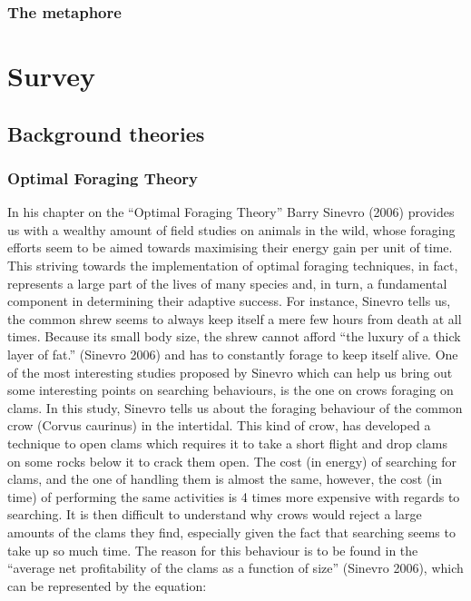 \documentclass{mproj}
\begin{document}
\subsection{The metaphore}


\chapter{Survey}\label{survey}

\section{Background theories }

\subsection{Optimal Foraging Theory}
In his chapter on the “Optimal Foraging Theory” Barry Sinevro (2006) provides us with a 
wealthy amount of field studies on animals in the wild, whose foraging efforts seem to be 
aimed towards maximising their energy gain per unit of time. This striving towards the 
implementation of optimal foraging techniques, in fact, represents a large part of the lives of 
many species and, in turn, a fundamental component in determining their adaptive success.
For instance, Sinevro tells us, the common shrew seems to always keep itself a mere few hours 
from death at all times. Because its small body size, the shrew cannot afford “the luxury of a 
thick layer of fat.” (Sinevro 2006) and has to constantly forage to keep itself alive. 
One of the most interesting studies proposed by Sinevro which can help us bring out some 
interesting points on searching behaviours, is the one on crows foraging on clams. In this 
study, Sinevro tells us about the foraging behaviour of the common crow (Corvus caurinus) in 
the intertidal. This kind of crow, has developed a technique to open clams which requires it to 
take a short flight and drop clams on some rocks below it to crack them open. The cost (in 
energy) of searching for clams, and the one of handling them is almost the same, however, the 
cost (in time) of performing the same activities is 4 times more expensive with regards to 
searching. It is then difficult to understand why crows would reject a large amounts of the 
clams they find, especially given the fact that searching seems to take up so much time. The 
reason for this behaviour is to be found in the “average net profitability of the clams as a 
function of size” (Sinevro 2006), which can be represented by the equation: 
\end{document}

